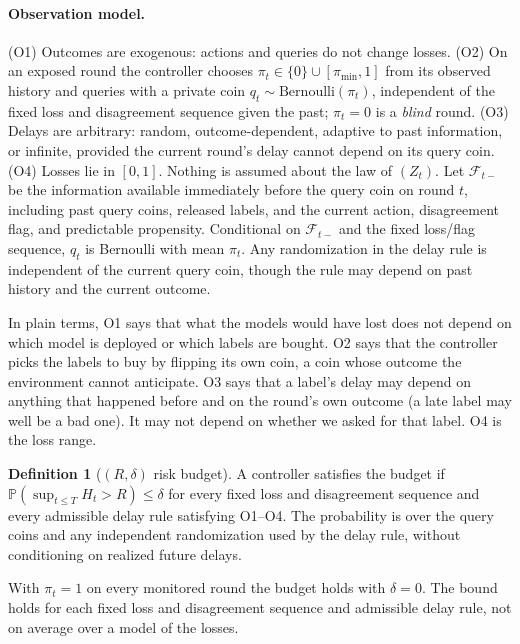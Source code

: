 \documentclass[10pt]{article}
\theoremstyle{plain}
\theoremstyle{definition}
\newtheorem{definition}{Definition}
\newcommand{\PP}{\mathbb{P}}
\begin{document}
\paragraph{Observation model.}
(O1) Outcomes are exogenous: actions and queries do not change losses. (O2) On an exposed round the controller chooses $\pi_t\in\{0\}\cup[\pi_{\min},1]$ from its observed history and queries with a private coin $q_t\sim\mathrm{Bernoulli}(\pi_t)$, independent of the fixed loss and disagreement sequence given the past; $\pi_t=0$ is a \emph{blind} round. (O3) Delays are arbitrary: random, outcome-dependent, adaptive to past information, or infinite, provided the current round's delay cannot depend on its query coin. (O4) Losses lie in $[0,1]$. Nothing is assumed about the law of $(Z_t)$. Let $\mathcal F_{t-}$ be the information available immediately before the query coin on round $t$, including past query coins, released labels, and the current action, disagreement flag, and predictable propensity. Conditional on $\mathcal F_{t-}$ and the fixed loss/flag sequence, $q_t$ is Bernoulli with mean $\pi_t$. Any randomization in the delay rule is independent of the current query coin, though the rule may depend on past history and the current outcome.

In plain terms, O1 says that what the models would have lost does not depend on which model is deployed or which labels are bought. O2 says that the controller picks the labels to buy by flipping its own coin, a coin whose outcome the environment cannot anticipate. O3 says that a label's delay may depend on anything that happened before and on the round's own outcome (a late label may well be a bad one). It may not depend on whether we asked for that label. O4 is the loss range.

\begin{definition}[$(R,\delta)$ risk budget]
A controller satisfies the budget if $\PP(\sup_{t\le T}H_t>R)\le\delta$ for every fixed loss and disagreement sequence and every admissible delay rule satisfying O1--O4. The probability is over the query coins and any independent randomization used by the delay rule, without conditioning on realized future delays.
\end{definition}
With $\pi_t=1$ on every monitored round the budget holds with $\delta=0$. The bound holds for each fixed loss and disagreement sequence and admissible delay rule, not on average over a model of the losses.
\end{document}
